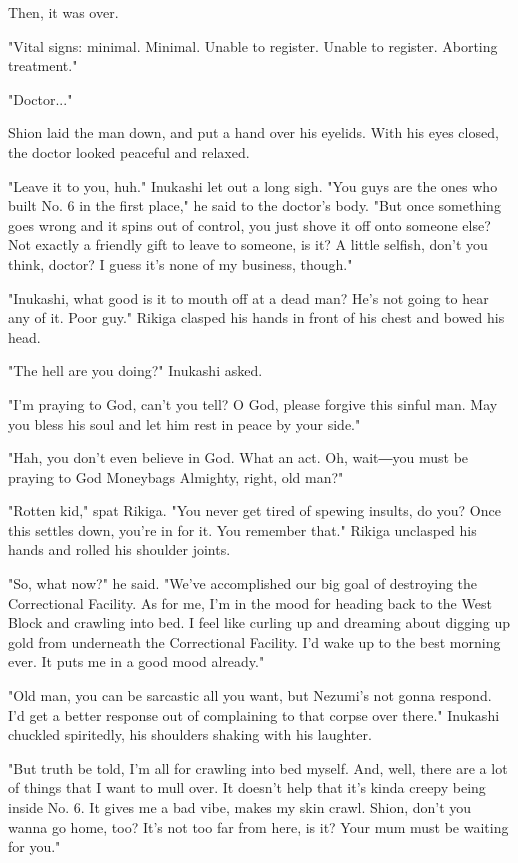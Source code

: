 Then, it was over.

"Vital signs: minimal. Minimal. Unable to register. Unable to register.
Aborting treatment."

"Doctor..."

Shion laid the man down, and put a hand over his eyelids. With his eyes
closed, the doctor looked peaceful and relaxed.

"Leave it to you, huh." Inukashi let out a long sigh. "You guys are the
ones who built No. 6 in the first place," he said to the doctor's body.
"But once something goes wrong and it spins out of control, you just
shove it off onto someone else? Not exactly a friendly gift to leave to
someone, is it? A little selfish, don't you think, doctor? I guess it's
none of my business, though."

"Inukashi, what good is it to mouth off at a dead man? He's not going to
hear any of it. Poor guy." Rikiga clasped his hands in front of his
chest and bowed his head.

"The hell are you doing?" Inukashi asked.

"I'm praying to God, can't you tell? O God, please forgive this sinful
man. May you bless his soul and let him rest in peace by your side."

"Hah, you don't even believe in God. What an act. Oh, wait―you must be
praying to God Moneybags Almighty, right, old man?"

"Rotten kid," spat Rikiga. "You never get tired of spewing insults, do
you? Once this settles down, you're in for it. You remember that."
Rikiga unclasped his hands and rolled his shoulder joints.

"So, what now?" he said. "We've accomplished our big goal of destroying
the Correctional Facility. As for me, I'm in the mood for heading back
to the West Block and crawling into bed. I feel like curling up and
dreaming about digging up gold from underneath the Correctional
Facility. I'd wake up to the best morning ever. It puts me in a good
mood already."

"Old man, you can be sarcastic all you want, but Nezumi's not gonna
respond. I'd get a better response out of complaining to that corpse
over there." Inukashi chuckled spiritedly, his shoulders shaking with
his laughter.

"But truth be told, I'm all for crawling into bed myself. And, well,
there are a lot of things that I want to mull over. It doesn't help that
it's kinda creepy being inside No. 6. It gives me a bad vibe, makes my
skin crawl. Shion, don't you wanna go home, too? It's not too far from
here, is it? Your mum must be waiting for you."

